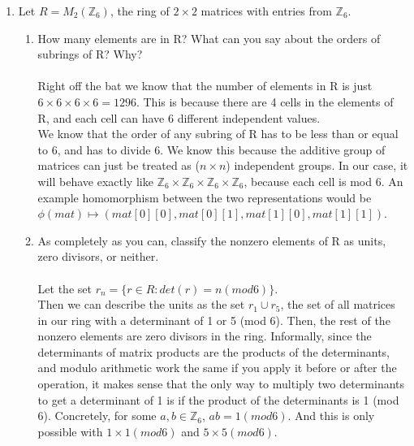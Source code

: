 \begin{enumerate}
  \item Let $R = M_2(\mathds{Z}_6)$, the ring of $2 \times 2$ matrices with entries from $\mathds{Z}_6$.

    \begin{enumerate}
      \item How many elements are in R? What can you say about the orders of subrings of R? Why?\\\\

        Right off the bat we know that the number of elements in R is just $6 \times 6 \times 6 \times 6 = 1296$. This is because there are 4 cells in the elements of R, and each cell can have 6 different independent values.\\
        We know that the order of any subring of R has to be less than or equal to 6, and has to divide 6. We know this because the additive group of matrices can just be treated as ($n \times n$) independent groups. In our case, it will behave exactly like $\mathds{Z}_6 \times \mathds{Z}_6 \times \mathds{Z}_6 \times \mathds{Z}_6$, because each cell is mod 6. An example homomorphism between the two representations would be $\phi(mat) \mapsto (mat[0][0], mat[0][1], mat[1][0], mat[1][1])$.

      \item As completely as you can, classify the nonzero elements of R as units, zero divisors, or neither.\\\\
        Let the set $r_n = \{r \in R : det(r) = n (mod 6)\}$.\\
        Then we can describe the units as the set $r_1 \cup r_5$, the set of all matrices in our ring with a determinant of 1 or 5 (mod 6). Then, the rest of the nonzero elements are zero divisors in the ring. Informally, since the determinants of matrix products are the products of the determinants, and modulo arithmetic work the same if you apply it before or after the operation, it makes sense that the only way to multiply two determinants to get a determinant of 1 is if the product of the determinants is 1 (mod 6). Concretely, for some $a,b \in \mathds{Z}_6$, $ab = 1 (mod 6)$. And this is only possible with $1 \times 1 (mod 6)$ and $5 \times 5 (mod 6)$.


\end{enumerate}
\end{enumerate}
